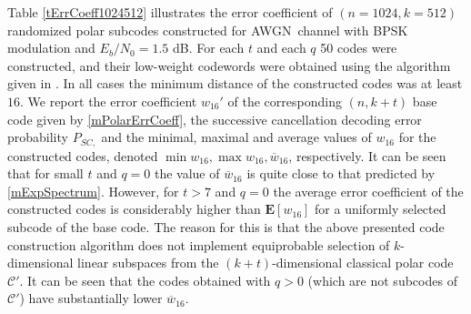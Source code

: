 \documentclass[conference]{IEEEtran}
\theoremstyle{plain}
\begin{document}
Table \ref{tErrCoeff1024512} illustrates the error coefficient of  $(n=1024,k=512)$ randomized polar subcodes constructed for AWGN\ channel with BPSK modulation and $E_b/N_0=1.5 $ dB.   For each $t$ and each $q$ 50 codes were constructed,  and their low-weight codewords  were obtained using the algorithm given in \cite{canteaut98new}. In all cases the minimum distance of the constructed codes was at least $16$.   We report the error coefficient $w_{16}'$ of the corresponding $(n,k+t)$ base code given by \eqref{mPolarErrCoeff}, the successive cancellation decoding error probability $P_{SC,}$ and the minimal, maximal and average values of $w_{16}$ for the constructed codes, denoted  $\min w_{16},\max w_{16},\overline w_{16}$, respectively.  It can be seen that for small $t$ and $q=0$ the value of $\overline w_{16}$ is quite close to that predicted by \eqref{mExpSpectrum}.
However, for $t>7$ and $q=0$ the average error coefficient of the constructed codes is considerably higher than $\mathbf E[w_{16}]$ for a uniformly selected subcode of the base code. The reason for this is that the above presented code construction algorithm does not implement equiprobable selection of $k$-dimensional linear subspaces from the $(k+t)$-dimensional classical polar code $\mathcal C'$. It can be seen that the codes obtained with $q>0$ (which are not subcodes of $\mathcal C'$) have substantially lower $\overline w_{16}$.   
\end{document}
